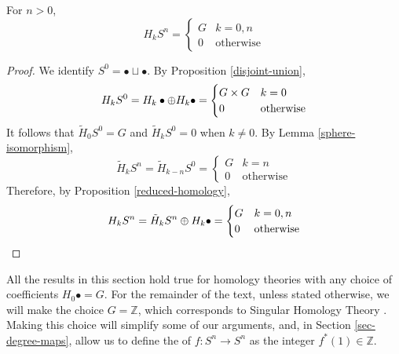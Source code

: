 \begin{prop}\label{homology-spheres}
For $n>0$,
$$H_kS^n=\begin{cases}G&k=0,n \\ 0 & \text{otherwise}\end{cases}$$
\end{prop}
\begin{proof}
We identify $S^{0}=\bullet \sqcup \bullet$. By Proposition \ref{disjoint-union}, $$H_k S^{0}=H_k\bullet \oplus H_k \bullet=\begin{cases}G\times G &k=0\\ 0 & \text{otherwise}\end{cases}$$ It follows that $\tilde{H}_0S^{0}=G$ and $\tilde{H}_kS^{0}=0$ when $k\neq 0$. By Lemma \ref{sphere-isomorphism}, $$\tilde{H}_kS^n=\tilde{H}_{k-n}S^{0}=\begin{cases}G & k=n\\0 & \text{otherwise}\end{cases}$$Therefore, by Proposition \ref{reduced-homology}, $$H_kS^n=\tilde{H}_kS^n\oplus H_k\bullet=\begin{cases}G&k=0,n \\ 0 & \text{otherwise}\end{cases}$$
\cite{Werndli}
\end{proof}

All the results in this section hold true for homology theories with any choice of coefficients $H_0\bullet=G$. For the remainder of the text, unless stated otherwise, we will make the choice $G=\mathbb{Z}$, which corresponds to Singular Homology Theory \cite{Hatcher}. Making this choice will simplify some of our arguments, and, in Section \ref{sec-degree-maps}, allow us to define the  of $f:S^n\rightarrow S^n$ as the integer $f^*(1)\in\mathbb{Z}$.